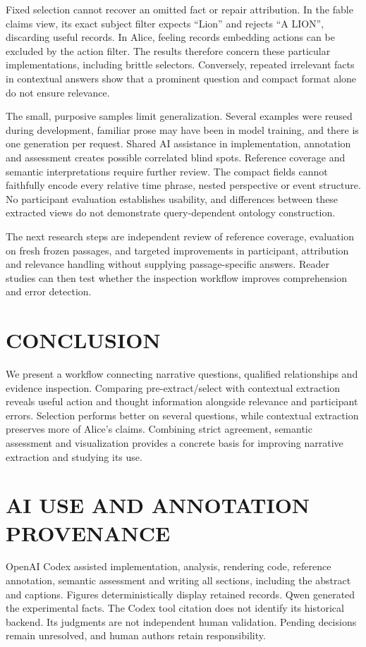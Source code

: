 \documentclass[a4paper,twoside]{article}
\begin{document}
Fixed selection cannot recover an omitted fact or repair attribution. In the fable claims view, its exact subject filter expects ``Lion'' and rejects ``A LION'', discarding useful records. In Alice, feeling records embedding actions can be excluded by the action filter. The results therefore concern these particular implementations, including brittle selectors. Conversely, repeated irrelevant facts in contextual answers show that a prominent question and compact format alone do not ensure relevance.

The small, purposive samples limit generalization. Several examples were reused during development, familiar prose may have been in model training, and there is one generation per request. Shared AI assistance in implementation, annotation and assessment creates possible correlated blind spots. Reference coverage and semantic interpretations require further review. The compact fields cannot faithfully encode every relative time phrase, nested perspective or event structure. No participant evaluation establishes usability, and differences between these extracted views do not demonstrate query-dependent ontology construction.

The next research steps are independent review of reference coverage, evaluation on fresh frozen passages, and targeted improvements in participant, attribution and relevance handling without supplying passage-specific answers. Reader studies can then test whether the inspection workflow improves comprehension and error detection.

\section{\uppercase{Conclusion}}
\noindent We present a workflow connecting narrative questions, qualified relationships and evidence inspection. Comparing pre-extract/select with contextual extraction reveals useful action and thought information alongside relevance and participant errors. Selection performs better on several questions, while contextual extraction preserves more of Alice's claims. Combining strict agreement, semantic assessment and visualization provides a concrete basis for improving narrative extraction and studying its use.

\section{\uppercase{AI Use and Annotation Provenance}}
\label{sec:disclosure}
\noindent OpenAI Codex \cite{openai2025} assisted implementation, analysis, rendering code, reference annotation, semantic assessment and writing all sections, including the abstract and captions. Figures deterministically display retained records. Qwen generated the experimental facts. The Codex tool citation does not identify its historical backend. Its judgments are not independent human validation. Pending decisions remain unresolved, and human authors retain responsibility.
\end{document}

